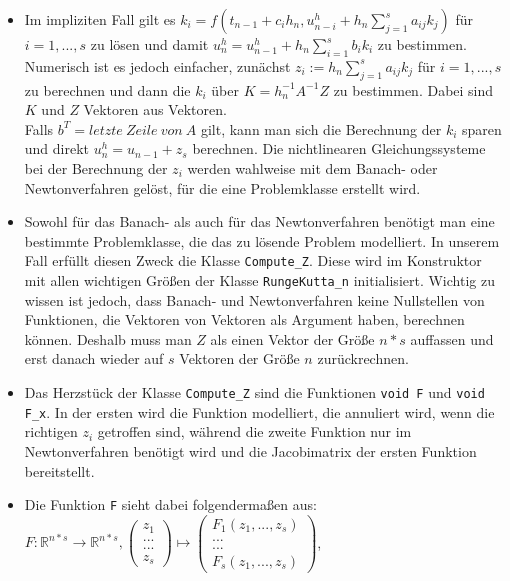 \documentclass[a4paper,11pt]{article}
\theoremstyle{definition}
\begin{document}
\begin{itemize}
\item Im impliziten Fall gilt es $k_i = f(t_{n-1}+c_ih_n, u_{n-i}^h+h_n \sum_{j=1}^s a_{ij}k_j)$ für $i = 1,...,s$ zu lösen und damit $u_n^h = u_{n-1}^h + h_n \sum_{i = 1}^s b_ik_i $ zu bestimmen. Numerisch ist es jedoch einfacher, zunächst $z_i := h_n \sum_{j=1}^s a_{ij}k_j$ für $i = 1,...,s$ zu berechnen und dann die $k_i$ über $K= h_n^{-1}A^{-1}Z$ zu bestimmen. Dabei sind $K$ und $Z$ Vektoren aus Vektoren. \\
Falls $b^T = letzte \ Zeile \ von \ A$ gilt, kann man sich die Berechnung der $k_i$ sparen und direkt $u_n^h = u_{n-1}+z_s$ berechnen. Die nichtlinearen Gleichungssysteme bei der Berechnung der $z_i$ werden wahlweise mit dem Banach- oder Newtonverfahren gelöst, für die eine Problemklasse erstellt wird.
\item Sowohl für das Banach- als auch für das Newtonverfahren benötigt man eine bestimmte Problemklasse, die das zu lösende Problem modelliert. In unserem Fall erfüllt diesen Zweck die Klasse \lstinline{Compute_Z}. Diese wird im Konstruktor mit allen wichtigen Größen der Klasse \lstinline{RungeKutta_n} initialisiert. Wichtig zu wissen ist jedoch, dass Banach- und Newtonverfahren keine Nullstellen von Funktionen, die Vektoren von Vektoren als Argument haben, berechnen können. Deshalb muss man $Z$ als einen Vektor der Größe $n*s$ auffassen und erst danach wieder auf $s$ Vektoren der Größe $n$ zurückrechnen.
\item Das Herzstück der Klasse \lstinline{Compute_Z} sind die Funktionen \lstinline{void F} und \lstinline{void F_x}. In der ersten wird die Funktion modelliert, die annuliert wird, wenn die richtigen $z_i$ getroffen sind, während die zweite Funktion nur im Newtonverfahren benötigt wird und die Jacobimatrix der ersten Funktion bereitstellt. 
\item Die Funktion \lstinline{F} sieht dabei folgendermaßen aus: \\
$F: \mathbb{R}^{n*s} \to \mathbb{R}^{n*s}, \left( \begin{array}{c}z_1 \\...\\...\\z_s\end{array} \right) \mapsto \left( \begin{array}{c}F_1(z_1,...,z_s)\\...\\...\\F_s(z_1,...,z_s)\end{array} \right)$, \\

\end{itemize}
\end{document}
